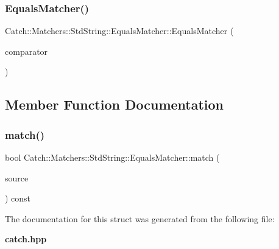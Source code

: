\subsubsection{EqualsMatcher()}
{\footnotesize\ttfamily Catch\+::\+Matchers\+::\+Std\+String\+::\+Equals\+Matcher\+::\+Equals\+Matcher (\begin{DoxyParamCaption}\item[{\textbf{ Cased\+String} const \&}]{comparator }\end{DoxyParamCaption})}



\subsection{Member Function Documentation}
\mbox{\label{struct_catch_1_1_matchers_1_1_std_string_1_1_equals_matcher_a0bb9d64693f7bb1ef7441062d219f21a}} 
\subsubsection{match()}
{\footnotesize\ttfamily bool Catch\+::\+Matchers\+::\+Std\+String\+::\+Equals\+Matcher\+::match (\begin{DoxyParamCaption}\item[{std\+::string const \&}]{source }\end{DoxyParamCaption}) const\hspace{0.3cm}{\ttfamily [override]}}



The documentation for this struct was generated from the following file\+:\begin{DoxyCompactItemize}
\item 
\textbf{ catch.\+hpp}\end{DoxyCompactItemize}
